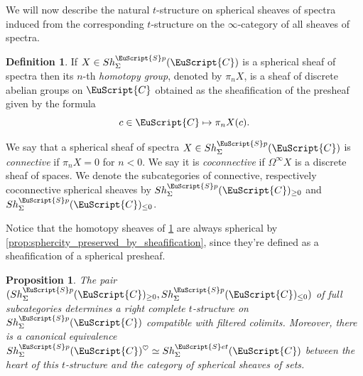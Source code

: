 \documentclass[oneside,a4paper]{amsart}
\newcommand{\euscr}[1]{\EuScript{#1}} %
\newcommand{\ccat}{\euscr{C}} %
\newcommand{\spectra}{\euscr{S}p} %
\newcommand{\sets}{\euscr{S}et} %
\theoremstyle{plain}
\newtheorem{prop}[thm]{Proposition}
\theoremstyle{definition}
\newtheorem{defin}[thm]{Definition}
\theoremstyle{remark}
\begin{document}
We will now describe the natural $t$-structure on spherical sheaves of spectra induced from the corresponding $t$-structure on the $\infty$-category of all sheaves of spectra.

\begin{defin}
\label{defin:homotopy_groups_of_a_hypercomplete_sheaf}
If $X \in Sh_{\Sigma}^{\spectra}(\ccat)$ is a spherical sheaf of spectra then its $n$-th \emph{homotopy group}, denoted by $\pi_{n}X$, is a sheaf of discrete abelian groups on $\ccat$ obtained as the sheafification of the presheaf given by the formula 
\[
c \in \ccat \mapsto \pi_{n} X(c).
\]

We say that a spherical sheaf of spectra $X \in Sh_{\Sigma}^{\spectra}(\ccat)$ is \emph{connective} if $\pi_{n}X = 0$ for $n < 0$. We say it is \emph{coconnective} if $\Omega^{\infty} X$ is a discrete sheaf of spaces. We denote the subcategories of connective, respectively coconnective spherical sheaves by $Sh_{\Sigma}^{\spectra}(\ccat)_{\geq 0}$ and $Sh_{\Sigma}^{\spectra}(\ccat)_{\leq 0}$. 
\end{defin}

Notice that the homotopy sheaves of \cref{defin:homotopy_groups_of_a_hypercomplete_sheaf} are always spherical by \cref{prop:sphercity_preserved_by_sheafification}, since they're defined as a sheafification of a spherical presheaf. 

\begin{prop}
\label{prop:tstructure_on_spherical_sheaves_of_spectra}
The pair $(Sh_{\Sigma}^{\spectra}(\ccat)_{\geq 0}, Sh_{\Sigma}^{\spectra}(\ccat)_{\leq 0})$ of full subcategories determines a right complete $t$-structure on $Sh_{\Sigma}^{\spectra}(\ccat)$ compatible with filtered colimits. Moreover, there is a canonical equivalence $Sh_{\Sigma}^{\spectra}(\ccat)^{\heartsuit} \simeq Sh_{\Sigma}^{\sets}(\ccat)$ between the heart of this $t$-structure and the category of spherical sheaves of sets. 
\end{prop}
\end{document}

